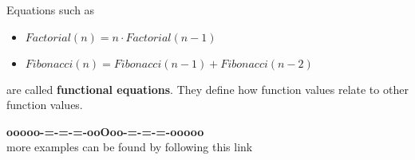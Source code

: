 \documentclass{ximera}
\begin{document}
Equations such as

\begin{itemize}
\item $Factorial(n) = n \cdot Factorial(n-1)$
\item $Fibonacci(n) = Fibonacci(n-1) + Fibonacci(n-2)$
\end{itemize}

are called \textbf{functional equations}.  They define how function values relate to other function values.






















\begin{center}
\textbf{\textcolor{green!50!black}{ooooo-=-=-=-ooOoo-=-=-=-ooooo}} \\

more examples can be found by following this link\\ 

\end{center}
\end{document}
